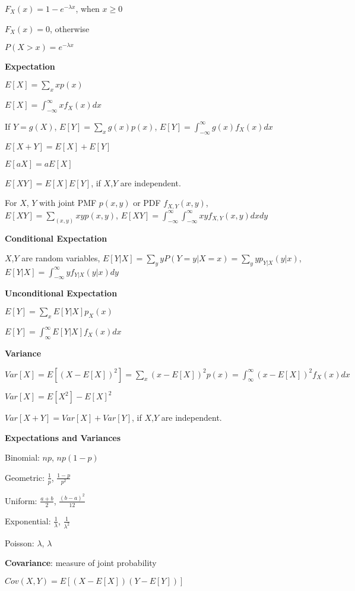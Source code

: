 \documentclass{scrartcl}
\begin{document}
\begin{multicols*}{3}
$F_X(x)= 1-e^{-\lambda x}$, when $x\geq 0$

$F_X(x)=0$, otherwise

$P(X>x)=e^{-\lambda x}$



{\bf Expectation}

$E[X] = \sum_xxp(x)$

$E[X] = \int_{-\infty}^{\infty}xf_X(x)dx$

If $Y=g(X)$, $E[Y] = \sum_xg(x)p(x)$, $E[Y] = \int_{-\infty}^{\infty}g(x)f_X(x)dx$

$E[X+Y] = E[X] + E[Y]$

$E[aX] = aE[X]$

$E[XY] = E[X]E[Y]$, if $X$,$Y$ are independent.

For $X$, $Y$ with joint PMF $p(x,y)$ or PDF $f_{X,Y}(x,y)$, $E[XY] = \sum_{(x,y)}xyp(x,y)$, $E[XY] = \int_{-\infty}^{\infty}\int_{-\infty}^{\infty}xyf_{X,Y}(x,y)dxdy$



{\bf Conditional Expectation}

$X$,$Y$ are random variables, $E[Y|X] = \sum_yyP(Y=y|X=x)=\sum_yyp_{Y|X}(y|x)$, $E[Y|X] = \int_{-\infty}^{\infty}yf_{Y|X}(y|x)dy$



{\bf Unconditional Expectation}

$E[Y] = \sum_xE[Y|X]p_X(x)$

$E[Y] = \int_{\infty}^{\infty}E[Y|X]f_X(x)dx$



{\bf Variance}

$Var[X] = E[(X-E[X])^2] = \sum_x(x-E[X])^2p(x) = \int_{\infty}^{\infty}(x-E[X])^2f_X(x)dx$

$Var[X]=E[X^2]-E[X]^2$

$Var[X+Y]=Var[X]+Var[Y]$, if $X$,$Y$ are independent.



{\bf Expectations and Variances}

Binomial: $np$, $np(1-p)$

Geometric: $\frac{1}{p}$, $\frac{1-p}{p^2}$

Uniform: $\frac{a+b}{2}$, $\frac{(b-a)^2}{12}$

Exponential: $\frac{1}{\lambda}$, $\frac{1}{\lambda^2}$

Poisson: $\lambda$, $\lambda$



{\bf Covariance}: measure of joint probability

$Cov(X,Y) = E[(X-E[X])(Y-E[Y])]$


\end{multicols*}
\end{document}
